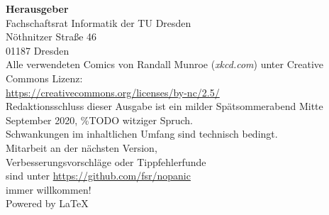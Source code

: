 \newpage
\thispagestyle{empty} %
\color{white}

\begin{minipage}[t][\textheight][b]{.65\textwidth}
\footnotesize
\textbf{Herausgeber} \\
Fachschaftsrat Informatik der TU Dresden\\
Nöthnitzer Straße 46\\
01187 Dresden\\[1\baselineskip]

Alle verwendeten Comics von Randall Munroe (\textit{xkcd.com}) unter Creative Commons Lizenz:\\
\url{https://creativecommons.org/licenses/by-nc/2.5/}\\[1\baselineskip]

Redaktionsschluss dieser Ausgabe ist ein milder Spätsommerabend Mitte September 2020, \%TODO witziger Spruch.\\%
Schwankungen im inhaltlichen Umfang sind technisch bedingt.\\[1\baselineskip]

Mitarbeit an der nächsten Version,\\
Verbesserungsvorschläge oder Tippfehlerfunde\\
sind unter \url{https://github.com/fsr/nopanic}\\
immer willkommen!\\[1\baselineskip]

Powered by \LaTeX
\end{minipage}%
\hfill%
